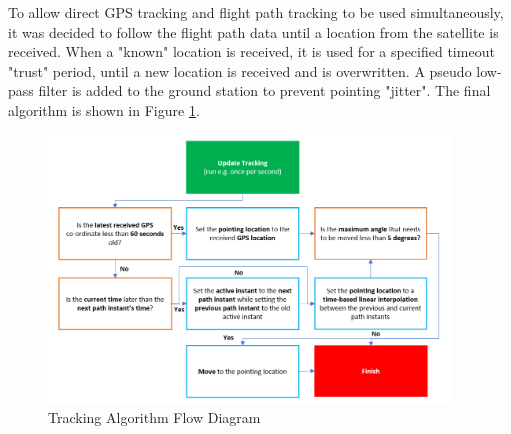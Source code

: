 To allow direct GPS tracking and flight path tracking to be used simultaneously, it was decided to follow the flight path data until a location from the satellite is received. When a "known" location is received, it is used for a specified timeout "trust" period, until a new location is received and is overwritten. A pseudo low-pass filter is added to the ground station to prevent pointing "jitter". The final algorithm is shown in Figure \ref{fig:trackingAlgorithm}.

\begin{figure}[!htb]
  \centering
  \includegraphics[width=0.95\textwidth]{trackingAlgorithm}
  \caption{Tracking Algorithm Flow Diagram}
  \label{fig:trackingAlgorithm}
\end{figure}